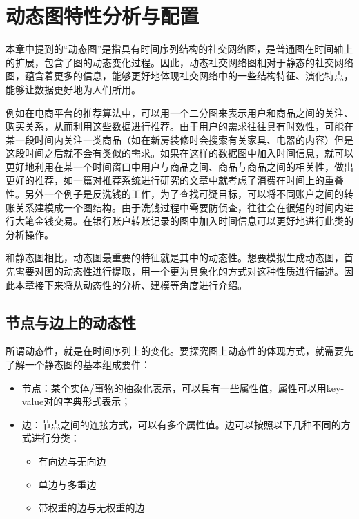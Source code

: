 
\chapter{动态图特性分析与配置}
\label{cha:chapter02}

本章中提到的“动态图”是指具有时间序列结构的社交网络图，是普通图在时间轴上的扩展，包含了图的动态变化过程。因此，动态社交网络图相对于静态的社交网络图，蕴含着更多的信息，能够更好地体现社交网络中的一些结构特征、演化特点，能够让数据更好地为人们所用。

例如在电商平台的推荐算法中，可以用一个二分图来表示用户和商品之间的关注、购买关系，从而利用这些数据进行推荐\cite{7009419}。由于用户的需求往往具有时效性，可能在某一段时间内关注一类商品（如在新房装修时会搜索有关家具、电器的内容）但是这段时间之后就不会有类似的需求。如果在这样的数据图中加入时间信息，就可以更好地利用在某一个时间窗口中用户与商品之间、商品与商品之间的相关性，做出更好的推荐，如一篇对推荐系统进行研究的文章\cite{NAJAFABADI2019526}中就考虑了消费在时间上的重叠性。另外一个例子是反洗钱的工作，为了查找可疑目标，可以将不同账户之间的转账关系建模成一个图结构。由于洗钱过程中需要防侦查，往往会在很短的时间内进行大笔金钱交易。在银行账户转账记录的图中加入时间信息可以更好地进行此类的分析操作\cite{pareja2019evolvegcn}。

和静态图相比，动态图最重要的特征就是其中的动态性。想要模拟生成动态图，首先需要对图的动态性进行提取，用一个更为具象化的方式对这种性质进行描述。因此本章接下来将从动态性的分析、建模等角度进行介绍。

\section{节点与边上的动态性}
\label{cha:node_edge_dynamic}

所谓动态性，就是在时间序列上的变化。要探究图上动态性的体现方式，就需要先了解一个静态图的基本组成要件：

\begin{itemize}
    \item 节点：某个实体/事物的抽象化表示，可以具有一些属性值，属性可以用key-value对的字典形式表示；
    \item 边：节点之间的连接方式，可以有多个属性值。边可以按照以下几种不同的方式进行分类：
    \begin{itemize}
        \item 有向边与无向边
        \item 单边与多重边
        \item 带权重的边与无权重的边
    \end{itemize}
\end{itemize}

